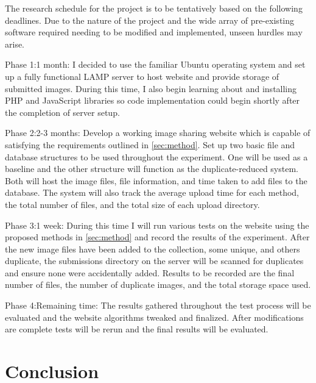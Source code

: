 \documentclass[11pt]{article}
\begin{document}
The research schedule for the project is to be tentatively based on the following deadlines.
Due to the nature of the project and the wide array of pre-existing software required needing to
be modified and implemented, unseen hurdles may arise.

Phase 1:1 month: I decided to use the familiar Ubuntu operating system and set up a fully functional LAMP server to host website and provide storage of submitted images. During this time, I also begin learning about and installing PHP and JavaScript libraries so code implementation could begin shortly after the completion of server setup.

Phase 2:2-3 months: Develop a working image sharing website which is capable of satisfying the requirements
outlined in \ref{sec:method}. Set up two basic file and database structures to be used throughout the experiment. One will be used as a baseline and the other structure will function as the duplicate-reduced system. Both will host the image files, file information, and time taken to add files to the database. The system will also track the average upload time for each method, the total number of files, and the total size of each upload directory.

Phase 3:1 week: During this time I will run various tests on the website using the proposed
methods in \ref{sec:method} and record the results of the experiment. After the new image files have been added to the collection, some unique, and others duplicate, the submissions directory on the server will be scanned for  duplicates and ensure none were accidentally added. Results to be recorded are the final number of files, the number of duplicate images, and the total storage space used.

Phase 4:Remaining time: The results gathered throughout the test process will be evaluated and
the website algorithms tweaked and finalized. After modifications are complete tests will be rerun and the
final results will be evaluated.
\vspace*{-.1in}
\section{Conclusion}
\label{sec:conclusion}
\vspace*{-.1in}

\end{document}
